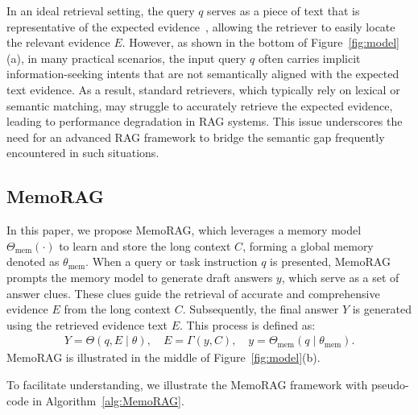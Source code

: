 \documentclass[sigconf]{acmart}
\begin{document}
In an ideal retrieval setting, the query $q$ serves as a piece of text that is representative of the expected evidence~\cite{liu2005statistical}, allowing the retriever to easily locate the relevant evidence $E$. However, as shown in the bottom of Figure~\ref{fig:model}(a), in many practical scenarios, the input query $q$ often carries implicit information-seeking intents that are not semantically aligned with the expected text evidence. As a result, standard retrievers, which typically rely on lexical or semantic matching, may struggle to accurately retrieve the expected evidence, leading to performance degradation in RAG systems.  This issue underscores the need for an advanced RAG framework to bridge the semantic gap frequently encountered in such situations.


\subsection{MemoRAG}

In this paper, we propose MemoRAG, which leverages a memory model $\Theta_{\text{mem}}(\cdot)$ to learn and store the long context $C$, forming a global memory denoted as $\theta_{\text{mem}}$. When a query or task instruction $q$ is presented, MemoRAG prompts the memory model to generate draft answers $y$, which serve as a set of answer clues. These clues guide the retrieval of accurate and comprehensive evidence $E$ from the long context $C$. Subsequently, the final answer $Y$ is generated using the retrieved evidence text $E$. This process is defined as:
\begin{align}
Y = \Theta(q, E \mid \theta), \quad E = \Gamma(y, C ), \quad y = \Theta_{\text{mem}}(q \mid \theta_{\text{mem}}).
\label{eq:def}
\end{align}
MemoRAG is illustrated in the middle of Figure~\ref{fig:model}(b).

To facilitate understanding, we illustrate the MemoRAG framework with pseudo-code in Algorithm~\ref{alg:MemoRAG}.
\end{document}
